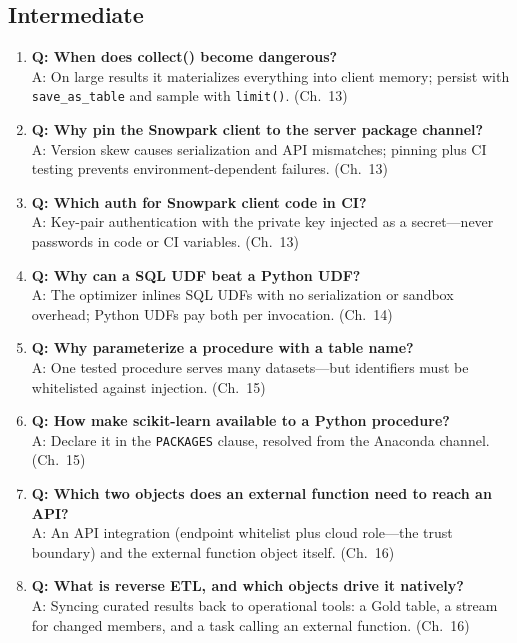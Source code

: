 \subsection{Intermediate}
\begin{enumerate}
    \item \textbf{Q: When does collect() become dangerous?}\\
    A: On large results it materializes everything into client memory; persist with \texttt{save\_as\_table} and sample with \texttt{limit()}. (Ch.~13)
    \item \textbf{Q: Why pin the Snowpark client to the server package channel?}\\
    A: Version skew causes serialization and API mismatches; pinning plus CI testing prevents environment-dependent failures. (Ch.~13)
    \item \textbf{Q: Which auth for Snowpark client code in CI?}\\
    A: Key-pair authentication with the private key injected as a secret---never passwords in code or CI variables. (Ch.~13)
    \item \textbf{Q: Why can a SQL UDF beat a Python UDF?}\\
    A: The optimizer inlines SQL UDFs with no serialization or sandbox overhead; Python UDFs pay both per invocation. (Ch.~14)
    \item \textbf{Q: Why parameterize a procedure with a table name?}\\
    A: One tested procedure serves many datasets---but identifiers must be whitelisted against injection. (Ch.~15)
    \item \textbf{Q: How make scikit-learn available to a Python procedure?}\\
    A: Declare it in the \texttt{PACKAGES} clause, resolved from the Anaconda channel. (Ch.~15)
    \item \textbf{Q: Which two objects does an external function need to reach an API?}\\
    A: An API integration (endpoint whitelist plus cloud role---the trust boundary) and the external function object itself. (Ch.~16)
    \item \textbf{Q: What is reverse ETL, and which objects drive it natively?}\\
    A: Syncing curated results back to operational tools: a Gold table, a stream for changed members, and a task calling an external function. (Ch.~16)
\end{enumerate}


